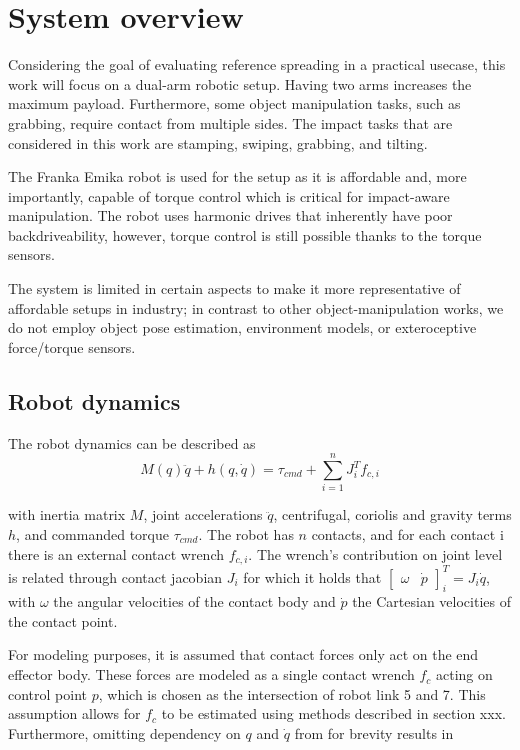 \documentclass[a4paper, 10pt, conference]{ieeeconf}
\begin{document}
    \section{System overview}
    Considering the goal of evaluating reference spreading in a practical usecase, this work will focus on a dual-arm robotic setup. Having two arms increases the maximum payload. Furthermore, some object manipulation tasks, such as grabbing, require contact from multiple sides. The impact tasks that are considered in this work are stamping, swiping, grabbing, and tilting. 

    The Franka Emika robot \cite{haddadinFrankaEmikaRobot2022} is used for the setup as it is affordable and, more importantly, capable of torque control which is critical for impact-aware manipulation. The robot uses harmonic drives that inherently have poor backdriveability, however, torque control is still possible thanks to the torque sensors. 

    The system is limited in certain aspects to make it more representative of affordable setups in industry; in contrast to other object-manipulation works, we do not employ object pose estimation, environment models, or exteroceptive force/torque sensors. 

    \subsection{Robot dynamics}
    The robot dynamics can be described as 
    \begin{equation}
    M(q)\ddot{q}+h(q,\dot{q})= \tau_{cmd} + \sum_{i=1}^n J_i^Tf_{c,i}
    \end{equation}
    
    with inertia matrix $M$, joint accelerations $\ddot{q}$, centrifugal, coriolis and gravity terms $h$, and commanded torque $\tau_{cmd}$. The robot has $n$ contacts, and for each contact i there is an external contact wrench $f_{c,i}$. The wrench's contribution on joint level is related through contact jacobian $J_i$ for which it holds that $\begin{bmatrix} \omega & \dot{p} \end{bmatrix}_i^T=J_i\dot{q}$, with $\omega$ the angular velocities of the contact body and $\dot{p}$ the Cartesian velocities of the contact point. 

    For modeling purposes, it is assumed that contact forces only act on the end effector body. These forces are modeled as a single contact wrench $f_c$ acting on control point $p$, which is chosen as the intersection of robot link 5 and 7. This assumption allows for $f_c$ to be estimated using methods described in section xxx. Furthermore, omitting dependency on $q$ and $\dot{q}$ from for brevity results in
\end{document}
